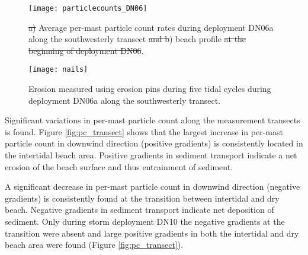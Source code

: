 \documentclass[preprint,12pt,authoryear,a4paper]{elsarticle}
\newcommand{\mrq}[2][]{}
\providecommand{\DIFadd}[1]{{\protect\color{blue}\uwave{#1}}} %
\providecommand{\DIFdel}[1]{{\protect\color{red}\sout{#1}}}                      %
\providecommand{\DIFaddFL}[1]{\DIFadd{#1}} %
\providecommand{\DIFdelFL}[1]{\DIFdel{#1}} %
\providecommand{\DIFaddbeginFL}{} %
\providecommand{\DIFaddendFL}{} %
\providecommand{\DIFdelbeginFL}{} %
\providecommand{\DIFdelendFL}{} %
\begin{document}
\begin{figure}
 \centering
  \DIFdelbeginFL %
\DIFdelendFL \DIFaddbeginFL \texttt{[image: particlecounts\_DN06]}
  \DIFaddendFL \caption{\DIFdelbeginFL \DIFdelFL{a) }\DIFdelendFL Average per-mast particle count rates during deployment DN06a
    along the southwesterly transect \DIFdelbeginFL \DIFdelFL{and b}\DIFdelendFL \DIFaddbeginFL \DIFaddFL{(upper panel}\DIFaddendFL ) \DIFaddbeginFL \DIFaddFL{and }\DIFaddendFL beach profile
    \DIFdelbeginFL \DIFdelFL{at the
    beginning of deployment DN06}\DIFdelendFL \DIFaddbeginFL \DIFaddFL{(lower panel)}\DIFaddendFL .}
  \label{fig:pc_transect_DN06}
\end{figure}

\begin{figure}
 \centering
  \DIFdelbeginFL %
\DIFdelendFL \DIFaddbeginFL \texttt{[image: nails]}
  \DIFaddendFL \caption{Erosion measured using erosion pins during five tidal
    cycles during deployment DN06a along the southwesterly transect.}
  \label{fig:nails}
\end{figure}

Significant variations in per-mast particle count along the
measurement transects is found. Figure \ref{fig:pc_transect} shows
that the largest increase in per-mast particle count in downwind
direction (positive gradients) is consistently located in the
intertidal beach area. Positive gradients in sediment transport
indicate a net erosion of the beach surface and thus entrainment of
sediment. \mrq[ss]{2.2}

A significant decrease in per-mast particle count in downwind
direction (negative gradients) is consistently found at the transition
between intertidal and dry beach. Negative gradients in sediment
transport indicate net deposition of sediment. Only during storm
deployment DN10 the negative gradients at the transition were absent
and large positive gradients in both the intertidal and dry beach area
were found (Figure \ref{fig:pc_transect}).
\end{document}
